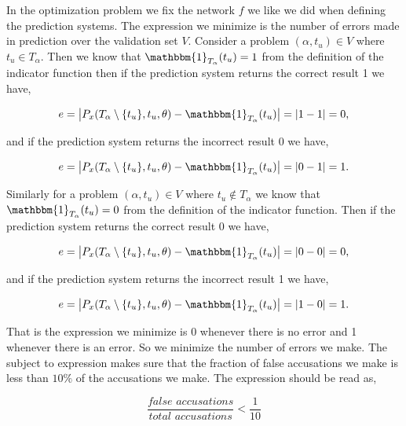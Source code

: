 In the optimization problem we fix the network $f$ we like we did when defining
the prediction systems. The expression we minimize is the number of errors made
in prediction over the validation set $V$. Consider a problem $(\alpha, t_u) \in
V$ where $t_u \in T_\alpha$. Then we know that $\mathbbm{1}_{T_\alpha}(t_u) =
1$ from the definition of the indicator function then if the prediction system
returns the correct result 1 we have,

\begin{equation}
    e = \left|
        P_x(T_\alpha \setminus \{t_u\}, t_u, \theta) -
        \mathbbm{1}_{T_\alpha}(t_u)
    \right| = |1 - 1| = 0,
\end{equation}

and if the prediction system returns the incorrect result 0 we have,

\begin{equation}
    e = \left|
        P_x(T_\alpha \setminus \{t_u\}, t_u, \theta) -
        \mathbbm{1}_{T_\alpha}(t_u)
    \right| = |0 - 1| = 1.
\end{equation}

Similarly for a problem $(\alpha, t_u) \in V$ where $t_u \notin T_\alpha$ we
know that $\mathbbm{1}_{T_\alpha}(t_u) = 0$ from the definition of the indicator
function. Then if the prediction system returns the correct result 0 we have,

\begin{equation}
    e = \left|
        P_x(T_\alpha \setminus \{t_u\}, t_u, \theta) -
        \mathbbm{1}_{T_\alpha}(t_u)
    \right| = |0 - 0| = 0, \end{equation}

and if the prediction system returns the incorrect result 1 we have,

\begin{equation}
    e = \left|
        P_x(T_\alpha \setminus \{t_u\}, t_u, \theta) -
        \mathbbm{1}_{T_\alpha}(t_u)
    \right| = |1 - 0| = 1.
\end{equation}

That is the expression we minimize is 0 whenever there is no error and 1
whenever there is an error. So we minimize the number of errors we make. The
subject to expression makes sure that the fraction of false accusations we make
is less than $10\%$ of the accusations we make. The expression should be read
as,

\begin{equation}
    \frac{\textit{false accusations}}{\textit{total accusations}} < \frac{1}{10}
\end{equation}

